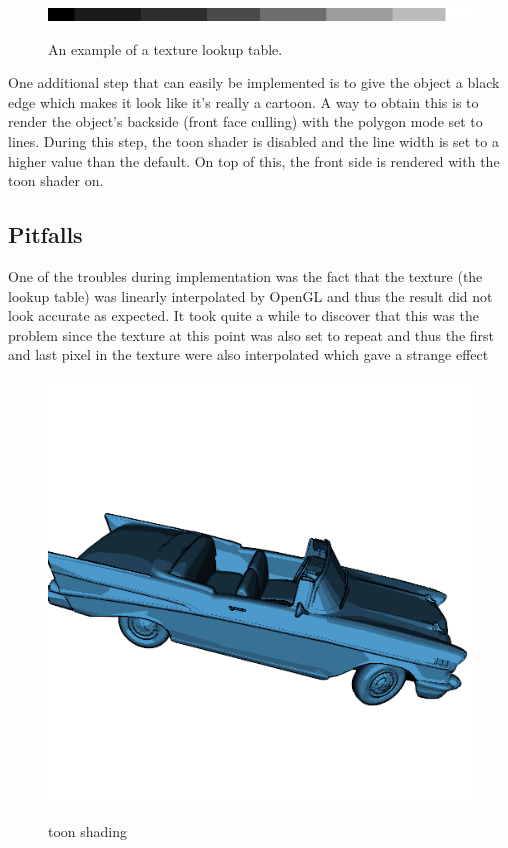 \documentclass[a4paper,12pt]{article}
\begin{document}
\begin{figure}[h]
  \begin{center}
		\scalebox{0.5} {\includegraphics[width=512px]{images/lightmap.png}}
    \caption{An example of a texture lookup table.}
    \label{fig:TextureLUT}
  \end{center}
\end{figure}


One additional step that can easily be implemented is to give the object a black edge which makes it look like it's really a cartoon. A way to obtain this is to render the object's backside (front face culling) with the polygon mode set to lines. During this step, the toon shader is disabled and the line width is set to a higher value than the default. On top of this, the front side is rendered with the toon shader on.

\subsection{Pitfalls}
\label{sec:PitfallsToonShader}

One of the troubles during implementation was the fact that the texture (the lookup table) was linearly interpolated by OpenGL and thus the result did not look accurate as expected. It took quite a while to discover that this was the problem since the texture at this point was also set to repeat and thus the first and last pixel in the texture were also interpolated which gave a strange effect


\begin{figure}[htbp]
  \begin{center}
		\scalebox{0.5} {\includegraphics[width=512px]{images/toon.png}}
    \caption{toon shading}
    \label{fig:toonShading}
  \end{center}
\end{figure}
\end{document}
